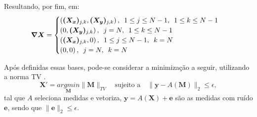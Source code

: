 \documentclass[cic,tc]{iiufrgs}
\renewcommand{\vec}[1]{\bm{#1}}
\newcommand{\mat}[1]{\bm{#1}}
\begin{document}
Resultando, por fim, em:
\begin{equation}
    \mat{\nabla X} = 
    \begin{cases}
        \left( \mat{(X_x)}_{j,k}, \mat{(X_y)}_{j,k} \right), \hspace{0.5em} 1 \le j \le N-1, \hspace{0.5em} 1 \le k \le N-1 \\
        \left( 0, \mat{(X_y)}_{j,k} \right), \hspace{0.5em} j=N, \hspace{0.5em} 1 \le k \le N-1 \\
        \left( \mat{(X_x)}_{j,k}, 0 \right), \hspace{0.5em} 1 \le j \le N-1, \hspace{0.5em} k=N \\
        \left(0,0\right), \hspace{0.5em} j = N, \hspace{0.5em} k=N
    \end{cases}
\end{equation}

Após definidas essas bases, pode-se considerar a minimização a seguir, utilizando a norma TV \cite{chen2015compressed}.
\begin{equation}
    \mat{X'} = \underset{\mat{M}}{argmin} \lVert \mat{M} \rVert_{TV} 
    \hspace{1em} \text{sujeito a} \hspace{1em}
    \lVert \vec{y} - A(\mat{M}) \rVert_2 \le \epsilon,
\end{equation}
tal que $A$ seleciona medidas e vetoriza, $\vec{y} = A(\mat{X}) + \vec{e}$ são as medidas com ruído $\vec{e}$,
sendo que $\lVert \vec{e} \rVert_2 \le \epsilon$.
\end{document}
